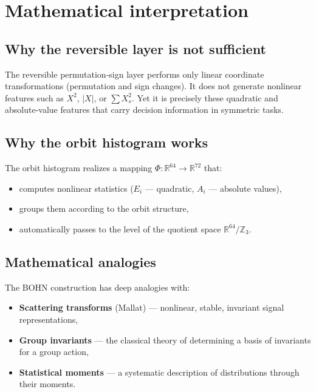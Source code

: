 \documentclass[11pt,a4paper]{report}
\begin{document}

\section{Mathematical interpretation}

\subsection{Why the reversible layer is not sufficient}

The reversible permutation-sign layer performs only linear coordinate transformations (permutation and sign changes). It does not generate nonlinear features such as $X^2$, $|X|$, or $\sum X_s^2$. Yet it is precisely these quadratic and absolute-value features that carry decision information in symmetric tasks.

\subsection{Why the orbit histogram works}

The orbit histogram realizes a mapping $\Phi\colon \mathbb{R}^{64}\to\mathbb{R}^{72}$ that:
\begin{itemize}
\item computes nonlinear statistics ($E_i$ --- quadratic, $A_i$ --- absolute values),
\item groups them according to the orbit structure,
\item automatically passes to the level of the quotient space $\mathbb{R}^{64}/\mathbb{Z}_3$.
\end{itemize}

\subsection{Mathematical analogies}

The BOHN construction has deep analogies with:
\begin{itemize}
\item \textbf{Scattering transforms} (Mallat) --- nonlinear, stable, invariant signal representations,
\item \textbf{Group invariants} --- the classical theory of determining a basis of invariants for a group action,
\item \textbf{Statistical moments} --- a systematic description of distributions through their moments.
\end{itemize}
\end{document}
